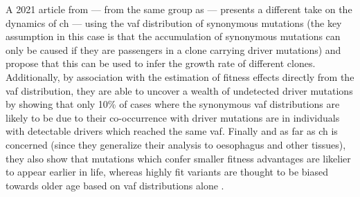 A 2021 article from  --- from the same group as \cite{Watson2020-pz} --- presents a different take on the dynamics of \ac{ch} --- using the \ac{vaf} distribution of synonymous mutations (the key assumption in this case is that the accumulation of synonymous mutations can only be caused if they are passengers in a clone carrying driver mutations) and propose that this can be used to infer the growth rate of different clones. Additionally, by association with the estimation of fitness effects directly from the \ac{vaf} distribution, they are able to uncover a wealth of undetected driver mutations by showing that only 10\% of cases where the synonymous \ac{vaf} distributions are likely to be due to their co-occurrence with driver mutations are in individuals with detectable drivers which reached the same \ac{vaf}. Finally and as far as \ac{ch} is concerned (since they generalize their analysis to oesophagus and other tissues), they also show that mutations which confer smaller fitness advantages are likelier to appear earlier in life, whereas highly fit variants are thought to be biased towards older age based on \ac{vaf} distributions alone \cite{Poon2020-ek}.

